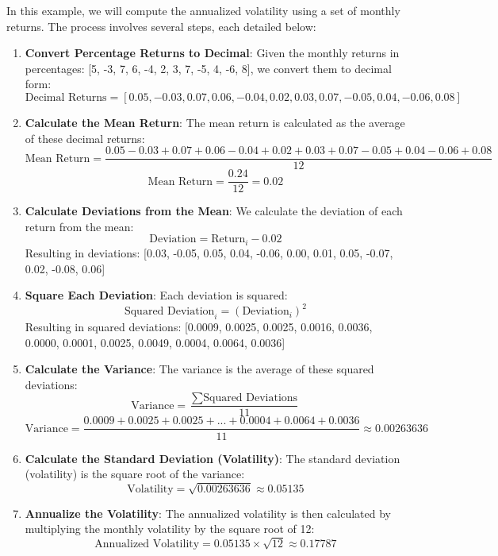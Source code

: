 \documentclass{article}
\begin{document}
In this example, we will compute the annualized volatility using a set of monthly returns. The process involves several steps, each detailed below:

\begin{enumerate}
    \item \textbf{Convert Percentage Returns to Decimal}:
    Given the monthly returns in percentages: [5, -3, 7, 6, -4, 2, 3, 7, -5, 4, -6, 8], we convert them to decimal form:
    \[ \text{Decimal Returns} = [0.05, -0.03, 0.07, 0.06, -0.04, 0.02, 0.03, 0.07, -0.05, 0.04, -0.06, 0.08] \]

    \item \textbf{Calculate the Mean Return}:
    The mean return is calculated as the average of these decimal returns:
    \[ \text{Mean Return} = \frac{0.05 - 0.03 + 0.07 + 0.06 - 0.04 + 0.02 + 0.03 + 0.07 - 0.05 + 0.04 - 0.06 + 0.08}{12} \]
    \[ \text{Mean Return} = \frac{0.24}{12} = 0.02 \]

    \item \textbf{Calculate Deviations from the Mean}:
    We calculate the deviation of each return from the mean:
    \[ \text{Deviation} = \text{Return}_i - 0.02 \]
    Resulting in deviations: [0.03, -0.05, 0.05, 0.04, -0.06, 0.00, 0.01, 0.05, -0.07, 0.02, -0.08, 0.06]

    \item \textbf{Square Each Deviation}:
    Each deviation is squared:
    \[ \text{Squared Deviation}_i = (\text{Deviation}_i)^2 \]
    Resulting in squared deviations: [0.0009, 0.0025, 0.0025, 0.0016, 0.0036, 0.0000, 0.0001, 0.0025, 0.0049, 0.0004, 0.0064, 0.0036]

    \item \textbf{Calculate the Variance}:
    The variance is the average of these squared deviations:
    \[ \text{Variance} = \frac{\sum \text{Squared Deviations}}{11} \]
    \[ \text{Variance} = \frac{0.0009 + 0.0025 + 0.0025 + ... + 0.0004 + 0.0064 + 0.0036}{11} \approx 0.00263636 \]

    \item \textbf{Calculate the Standard Deviation (Volatility)}:
    The standard deviation (volatility) is the square root of the variance:
    \[ \text{Volatility} = \sqrt{0.00263636} \approx 0.05135 \]

    \item \textbf{Annualize the Volatility}:
    The annualized volatility is then calculated by multiplying the monthly volatility by the square root of 12:
    \[ \text{Annualized Volatility} = 0.05135 \times \sqrt{12} \approx 0.17787 \]
\end{enumerate}
\end{document}
